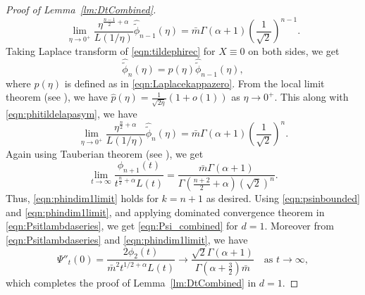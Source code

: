 \documentclass{article}[12pt]
\theoremstyle{definition}
\newcommand{\1}{\mathbbm{1}}
\begin{document}
\begin{proof}[Proof of Lemma~\ref{lm:DtCombined}]
\begin{equation}
    \lim_{\eta \to 0^+}\frac{\eta^{\frac{n-1}{2}+\alpha}}{L(1/\eta)}\hat{\tilde{\phi}}_{n-1}(\eta) = \bar{m}\Gamma(\alpha+1)\left(\frac{1}{\sqrt{2}}\right)^{n-1}.
    \label{eqn:phitildelapasym}
\end{equation}
Taking Laplace transform of \eqref{eqn:tildephirec} for $X\equiv 0$ on both sides, we get
$$\hat{\tilde{\phi}}_n(\eta) = \hat{p}(\eta)\hat{\tilde{\phi}}_{n-1}(\eta),$$
where $\hat{p}(\eta)$ is defined as in \eqref{eqn:Laplacekappazero}. From the local limit theorem (see \cite[Chapter~II.7, Proposition~9]{S1964}), we have $\hat{p}(\eta) = \frac{1}{\sqrt{2\eta}}(1+o(1))$ as $\eta\to 0^+$. This along with \eqref{eqn:phitildelapasym}, we have
$$\lim_{\eta \to 0^+}\frac{\eta^{\frac{n}{2}+\alpha}}{L(1/\eta)}\hat{\tilde{\phi}}_{n}(\eta) = \bar{m}\Gamma(\alpha+1)\left(\frac{1}{\sqrt{2}}\right)^{n}.$$
Again using Tauberian theorem (see \cite[Chapter~XIII.5, Theorem~2]{F1971}), we get 
$$ \lim_{t\to \infty}\frac{\phi_{n+1}(t)}{t^{\frac{n}{2}+\alpha}L(t)} = \frac{\bar{m}\Gamma(\alpha + 1)}{\Gamma\left(\frac{n+2}{2}+\alpha\right)(\sqrt{2})^{n}}.$$
Thus, \eqref{eqn:phindim1limit} holds for $k = n+1$ as desired. Using \eqref{eqn:psinbounded} and \eqref{eqn:phindim1limit}, and applying dominated convergence theorem in \eqref{eqn:Psitlambdaseries}, we get \eqref{eqn:Psi_combined} for $d=1$. Moreover from  \eqref{eqn:Psitlambdaseries} and \eqref{eqn:phindim1limit}, we have
$$\Psi''_t(0) = \frac{2\phi_2(t)}{\bar{m}^2 t^{1/2 + \alpha}L(t)} \rightarrow \frac{\sqrt{2}\Gamma(\alpha+1)}{\Gamma(\alpha+\frac{3}{2})\bar{m}} \quad \text{as } t\to \infty,$$
which completes the proof of Lemma~\ref{lm:DtCombined} in $d=1$.

\end{proof}
\end{document}
